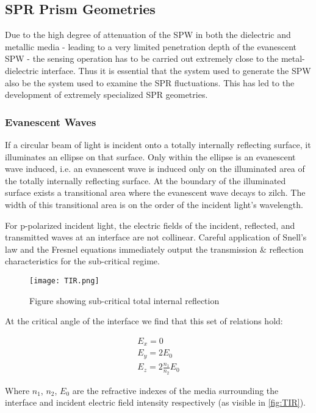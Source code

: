 \subsection{SPR Prism Geometries}

Due to the high degree of attenuation of the SPW in both the dielectric and metallic media - leading to a very limited penetration depth of the evanescent SPW - the sensing operation has to be carried out extremely close to the metal-dielectric interface. Thus it is essential that the system used to generate the SPW also be the system used to examine the SPR fluctuations. This has led to the development of extremely specialized SPR geometries.  

\subsubsection{Evanescent Waves}

If a circular beam of light is incident onto a totally internally reflecting surface, it illuminates an ellipse on that surface. Only within the ellipse is an evanescent wave induced, i.e. an evanescent wave is induced only on the illuminated area of the totally internally reflecting surface. At the boundary of the illuminated surface exists a transitional area where the evanescent wave decays to zilch. The width of this transitional area is on the order of the incident light's wavelength. 

For p-polarized incident light, the electric fields of the incident, reflected, and transmitted waves at an interface are not collinear. Careful application of Snell's law and the Fresnel equations immediately output the transmission \& reflection characteristics for the sub-critical regime. 

\begin{figure}
\centering
	\texttt{[image: TIR.png]}
\caption{Figure showing sub-critical total internal reflection}
\label{fig:TIR}
\end{figure}

At the critical angle of the interface we find that this set of relations hold:

\begin{eqnarray}\label{super_crit_TIR}
E_x = 0 \\
E_y = 2E_0 \\
E_z = 2 \frac{n_1}{n_2} E_0
\end{eqnarray}

Where $n_1$, $n_2$, $E_0$ are the refractive indexes of the media surrounding the interface and incident electric field intensity respectively (as visible in \autoref{fig:TIR}). 

